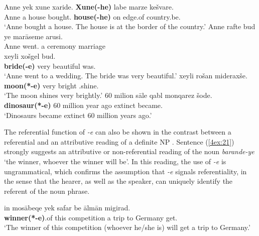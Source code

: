 \documentclass[output=paper]{langsci/langscibook}
\begin{document}
\begin{exe}
\ex\label{4ex:20}
	\begin{xlista}
	\ex\label{4ex:20a}
	\gll	Anne yek	xune		xaride.    			{\bf{Xune(-he)}}		labe		marze	kešvare. \\
          	Anne a	house  	bought.{}	{\bf{house(-he)}}	on		edge.of	country.be.{} \\
         \glt	`Anne bought a house. The house is at the border of the country.'
	\ex\label{4ex:20b}
      	\gll	Anne 	rafte			bud			ye	marāseme	arusi.    \\ 
         	Anne 	went.{}	{} 	a  	ceremony  	marriage \\
	\glt	
	\exi{}
	   xeyli  xošgel     bud. \\
		{\bf{bride(-e)}}  very   beautiful was.{} \\
        \glt  	`Anne went to a wedding.  The bride was very beautiful.'
	\ex\label{4ex:20c}
      	    	xeyli rošan  	mideraxše. \\
          	{\bf{moon(*-e)}}  	very  bright  	{}.shine.{} \\
       	\glt	`The moon shines very brightly.'
	\ex\label{4ex:20d}
	 	60 	milion	sāle  qabl 	monqarez		šode. \\
        		{\bf{dinosaur(*-e)}} 	60	million	year	ago	extinct		became.{} \\
        \glt	`Dinosaurs became extinct 60 million years ago.'
	\end{xlista}
\end{exe}

The referential function of {\emph{-e}} can also be shown in the contrast between a referential and an attributive reading of a definite NP \citep{donnellan:66, keenan:ebert:73}. Sentence (\ref{4ex:21}) strongly suggests an attributive or non-referential reading of the noun {\emph{barande-ye}} `the winner, whoever the winner will be'. In this reading, the use of {\emph{-e}} is ungrammatical, which confirms the assumption that \mbox{\emph{-e}} signals referentiality, in the sense that the hearer, as well as the speaker, can uniquely identify the referent of the noun phrase.

\begin{exe}
\ex\label{4ex:21}
	in	mosābeqe  	yek safar  	be ālmān 	    migirad.	 \\
	{\bf{winner(*-e)}}.of	this	competition  	a     trip  to	Germany	get.{} \\
\glt	`The winner of this competition (whoever he/she is) will get a trip to Germany.'
\end{exe}
\end{document}
